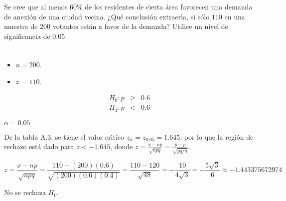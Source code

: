 \begin{enunciado}
 Se cree que al menos $60\%$ de los residentes de cierta \'area favorecen
 una demanda de anexi\'on de una ciudad vecina.
 ¿Qu\'e conclusi\'on extraer\'{\i}a, si s\'olo $110$ en una muestra de $200$ votantes
 est\'an a favor de la demanda?
 Utilice un nivel de significancia de $0.05$
\end{enunciado}

\begin{solucion}
 \begin{datos}
  $\phantom{0}$
  \begin{itemize}
   \item $n = 200$.
   \item $x = 110$.
  \end{itemize}
 \end{datos}

 \begin{hipotesis}
  \begin{eqnarray*}
   H_0: p & \geq & 0.6 \\
   H_1: p &  <   & 0.6
  \end{eqnarray*}
 \end{hipotesis}

 \begin{significancia}
  $\alpha = 0.05$
 \end{significancia}

 \begin{region}
  De la tabla A.3, se tiene el valor cr\'{\i}tico $z_{\alpha} = z_{0.05} = 1.645$,
  por lo que la regi\'on de rechazo est\'a dado para $z < -1.645$,
  donde $z = \frac{x - np}{\sqrt{npq}} 
  = \frac{\widehat{p} - p}{\sqrt{pq/n}}$.
 \end{region}

 \begin{estadistico}
  \begin{equation*}
   z = \frac{x - np}{\sqrt{npq}}
   = \frac{110 - (200)(0.6)}{\sqrt{(200)(0.6)(0.4)}}
   = \frac{110 - 120}{\sqrt{48}}
   = - \frac{10}{4\sqrt{3}}
   = - \frac{5\sqrt{3}}{6}
   \approx - 1.443375672974
  \end{equation*}
 \end{estadistico}

 \begin{decision}
  No se rechaza $H_0$.
 \end{decision}


\end{solucion}
